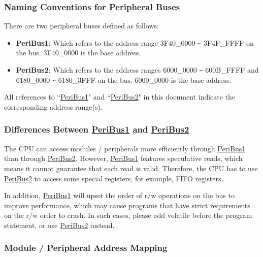 \documentclass[main\_\_EN.tex]{subfiles}
\begin{document}
\subsubsection{Naming Conventions for Peripheral Buses} \label{Convention: Peripheral Bus Name}
There are two peripheral buses defined as follows:
\begin{itemize}
    \item \textbf{PeriBus1}\label{PeripheralBus1}: Which refers to the address range \hexprefix{}3F40\_0000 \verb+~+ \hexprefix{}3F4F\_FFFF on the bus. \hexprefix{}3F40\_0000 is the base address.
    \item \textbf{PeriBus2}\label{PeripheralBus2}: Which refers to the address ranges \hexprefix{}6000\_0000 \verb+~+ \hexprefix{}600B\_FFFF and \hexprefix{}6180\_0000 \verb+~+ \hexprefix{}6180\_3FFF on the bus. \hexprefix{}6000\_0000 is the base address.
\end{itemize}

All references to ``\hyperref[PeripheralBus1]{PeriBus1}" and ``\hyperref[PeripheralBus2]{PeriBus2}" in this document indicate the corresponding address range(s).

\subsubsection{Differences Between \hyperref[PeripheralBus1]{PeriBus1} and \hyperref[PeripheralBus2]{PeriBus2}} \label{differences_between_buses}

The CPU can access modules / peripherals more efficiently through \hyperref[PeripheralBus1]{PeriBus1} than through \hyperref[PeripheralBus2]{PeriBus2}. However, \hyperref[PeripheralBus1]{PeriBus1} features speculative reads, which means it cannot guarantee that each read is valid. Therefore, the CPU has to use \hyperref[PeripheralBus2]{PeriBus2} to access some special registers, for example, FIFO registers.

In addition, \hyperref[PeripheralBus1]{PeriBus1} will upset the order of r/w operations on the bus to improve performance, which may cause programs that have strict requirements on the r/w order to crash. In such cases, please add volatile before the program statement, or use \hyperref[PeripheralBus2]{PeriBus2} instead.

\subsubsection{Module / Peripheral Address Mapping}
\end{document}
